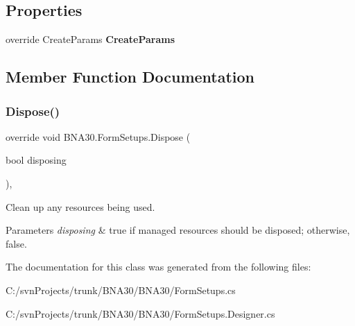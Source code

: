 \subsection*{Properties}
\begin{DoxyCompactItemize}
\item 
\mbox{\label{class_b_n_a30_1_1_form_setups_abe31a21d966f05644b8e1a6c154e90ba}} 
override Create\+Params {\bfseries Create\+Params}
\end{DoxyCompactItemize}


\subsection{Member Function Documentation}
\mbox{\label{class_b_n_a30_1_1_form_setups_ac9d2080c1d93484a1ab0a2cd9224cae2}} 
\subsubsection{\texorpdfstring{Dispose()}{Dispose()}}
{\footnotesize\ttfamily override void B\+N\+A30.\+Form\+Setups.\+Dispose (\begin{DoxyParamCaption}\item[{bool}]{disposing }\end{DoxyParamCaption})\hspace{0.3cm}{\ttfamily [inline]}, {\ttfamily [protected]}}



Clean up any resources being used. 


\begin{DoxyParams}{Parameters}
{\em disposing} & true if managed resources should be disposed; otherwise, false.\\
\hline
\end{DoxyParams}


The documentation for this class was generated from the following files\+:\begin{DoxyCompactItemize}
\item 
C\+:/svn\+Projects/trunk/\+B\+N\+A30/\+B\+N\+A30/Form\+Setups.\+cs\item 
C\+:/svn\+Projects/trunk/\+B\+N\+A30/\+B\+N\+A30/Form\+Setups.\+Designer.\+cs\end{DoxyCompactItemize}
